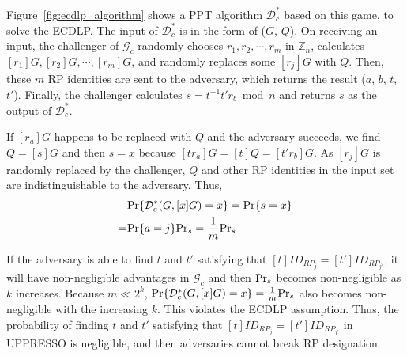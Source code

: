 Figure~\ref{fig:ecdlp_algorithm} shows a PPT algorithm $\mathcal{D}^*_c$ based on this game, to solve the ECDLP.
The input of $\mathcal{D}^*_c$ is in the form of ($G$, $Q$).
On receiving an input, the challenger of $\mathcal{G}_c$ randomly chooses $r_1, r_2, \cdots, r_m$ in $\mathbb{Z}_n$,
 calculates $[r_1]G, [r_2]G, \cdots, [r_m]G$,
 and randomly replaces some $[r_j]G$ with $Q$.
Then,
    these $m$ RP identities are sent to the adversary,
which returns the result ($a$, $b$, $t$, $t'$).
Finally, the challenger calculates $s = t^{-1}t'r_b \bmod n$ and returns $s$ as the output of $\mathcal{D}^*_c$.

If $[r_a]G$ happens to be replaced with $Q$ and the adversary succeeds,
    we find $Q = [s]G$ and then $s=x$ because $[tr_a]G = [t]Q = [t'r_b]G$.
As $[r_j]G$ is randomly replaced by the challenger,
    $Q$ and other RP identities in the input set are indistinguishable to the adversary.
Thus,
\begin{align*}
&{\rm Pr}\{\mathcal{D}^*_c(G, [x]G)=x\} = {\rm Pr}\{s = x\}\\=&{\rm Pr}\{a=j\}{\rm Pr}_s=\frac{1}{m}{\rm Pr}_s
\end{align*}

If the adversary is able to find $t$ and $t'$
    satisfying that $[t]ID_{RP_j} = [t']ID_{RP_{j'}}$,
    it will have non-negligible advantages in $\mathcal{G}_c$
        and then
         ${\rm Pr}_s$ becomes non-negligible as $k$ increases.
Because $m \ll 2^k$, ${\rm Pr}\{\mathcal{D}^*_c(G, [x]G)=x\} = \frac{1}{m}{\rm Pr}_s$ also
becomes non-negligible with the increasing $k$.
This violates the ECDLP assumption.
Thus, the probability of finding $t$ and $t'$ satisfying that $[t]ID_{RP_j} = [t']ID_{RP_{j'}}$ in UPPRESSO is negligible,
    and then adversaries cannot break RP designation.





